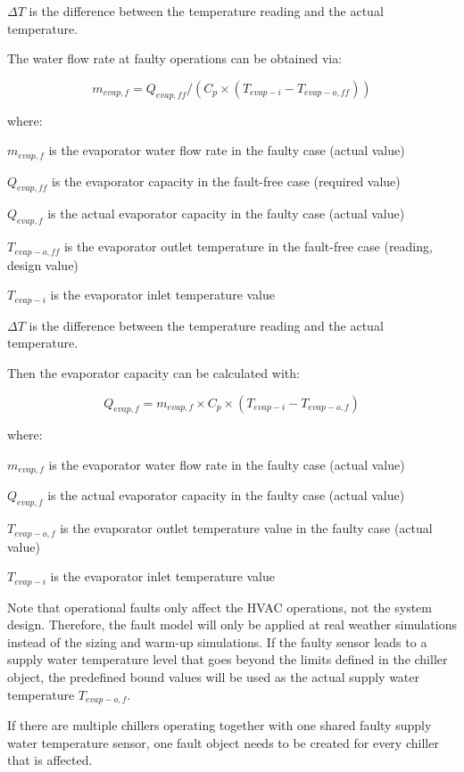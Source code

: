 \(\Delta T\) is the difference between the temperature reading and the actual temperature.

The water flow rate at faulty operations can be obtained via:

\begin{equation}
m_{evap,f} = Q_{evap,ff} / ( C_p \times (T_{evap-i} - T_{evap-o,ff} ) )
\end{equation}

where:

\(m_{evap,f}\) is the evaporator water flow rate in the faulty case (actual value)

\(Q_{evap,ff}\) is the evaporator capacity in the fault-free case (required value)

\(Q_{evap,f}\) is the actual evaporator capacity in the faulty case (actual value)

\(T_{evap-o,ff}\) is the evaporator outlet temperature in the fault-free case (reading, design value)

\(T_{evap-i}\) is the evaporator inlet temperature value

\(\Delta T\) is the difference between the temperature reading and the actual temperature.

Then the evaporator capacity can be calculated with:

\begin{equation}
Q_{evap,f} = m_{evap,f} \times C_p \times (T_{evap-i} - T_{evap-o,f} )
\end{equation}

where:

\(m_{evap,f}\) is the evaporator water flow rate in the faulty case (actual value)

\(Q_{evap,f}\) is the actual evaporator capacity in the faulty case (actual value)

\(T_{evap-o,f}\) is the evaporator outlet temperature value in the faulty case (actual value)

\(T_{evap-i}\) is the evaporator inlet temperature value

Note that operational faults only affect the HVAC operations, not the system design. Therefore, the fault model will only be applied at real weather simulations instead of the sizing and warm-up simulations. If the faulty sensor leads to a supply water temperature level that goes beyond the limits defined in the chiller object, the predefined bound values will be used as the actual supply water temperature \(T_{evap-o,f}\).

If there are multiple chillers operating together with one shared faulty supply water temperature sensor, one fault object needs to be created for every chiller that is affected.


